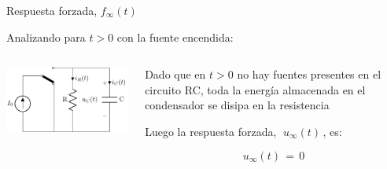 \documentclass[aspectratio=169, usenames,svgnames,dvipsnames]{beamer}
\begin{document}

\begin{frame}{Respuesta forzada, \hspace{3mm}$f_\infty(t)$}
    
    \vspace{-3mm}
    Analizando para $t>0$ con la \alert{fuente encendida}:

    \vspace{3mm}
    \begin{columns}
    \begin{column}{0.4\columnwidth}

        \vspace{5mm}
        
        \hspace*{-3mm}
        \includegraphics[height=0.42\textheight]{../figs/transitorio_circuitoRC_t0+.pdf}
    \end{column}
    \hfill
    \begin{column}{0.52\columnwidth}
        \vspace{5mm}

        Dado que en $t>0$ \alert{no hay fuentes} presentes en el circuito RC, toda la \alert{energía almacenada} en el condensador \alert{se disipa} en la resistencia

        \vspace{9mm}
        Luego la \alert{respuesta forzada}, $\; u_\infty(t) \,$, es:
        
        \begin{equation*}
            \boxed{\; u_\infty(t) \,=\, 0 \;}
        \end{equation*}
        
    \end{column}
    \end{columns}  
\end{frame}

\end{document}
